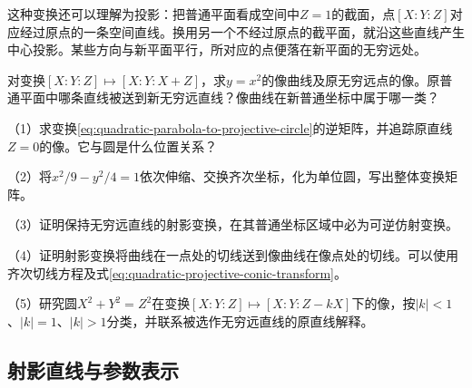 这种变换还可以理解为投影：把普通平面看成空间中\(Z=1\)的截面，点\([X:Y:Z]\)对应经过原点的一条空间直线。换用另一个不经过原点的截平面，就沿这些直线产生中心投影。某些方向与新平面平行，所对应的点便落在新平面的无穷远处。

\par\addvspace{6pt}
\noindent\begin{minipage}{\linewidth}
\begin{example}
对变换\([X:Y:Z]\mapsto[X:Y:X+Z]\)，求\(y=x^2\)的像曲线及原无穷远点的像。原普通平面中哪条直线被送到新无穷远直线？像曲线在新普通坐标中属于哪一类？
\end{example}
\end{minipage}\par\addvspace{6pt}

\begin{exercise}
\mbox{}\par\nobreak
\begin{samepage}
（1）求变换\eqref{eq:quadratic-parabola-to-projective-circle}的逆矩阵，并追踪原直线\(Z=0\)的像。它与圆是什么位置关系？
\par
\end{samepage}

\begin{samepage}
（2）将\(x^2/9-y^2/4=1\)依次伸缩、交换齐次坐标，化为单位圆，写出整体变换矩阵。
\par
\end{samepage}

\begin{samepage}
（3）证明保持无穷远直线的射影变换，在其普通坐标区域中必为可逆仿射变换。
\par
\end{samepage}

\begin{samepage}
（4）证明射影变换将曲线在一点处的切线送到像曲线在像点处的切线。可以使用齐次切线方程及式\eqref{eq:quadratic-projective-conic-transform}。
\par
\end{samepage}

\begin{samepage}
（5）研究圆\(X^2+Y^2=Z^2\)在变换\([X:Y:Z]\mapsto[X:Y:Z-kX]\)下的像，按\(|k|<1\)、\(|k|=1\)、\(|k|>1\)分类，并联系被选作无穷远直线的原直线解释。
\par
\end{samepage}
\end{exercise}

\subsection{射影直线与参数表示}
\label{subsec:quadratic-projective-parametrization}

